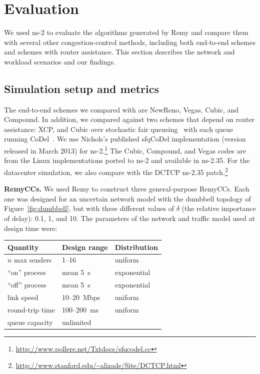 \section{Evaluation}
\label{remy:eval}

We used ns-2 to evaluate the algorithms generated by Remy and compare
them with several other congestion-control methods, including both
end-to-end schemes and schemes with router assistance. This section
describes the network and workload scenarios and our findings.

\subsection{Simulation setup and metrics}

 The end-to-end schemes
we compared with are NewReno, Vegas, Cubic, and Compound. In addition,
we compared against two schemes that depend on router assistance: XCP,
and Cubic over stochastic fair queueing~\cite{sfq} with each queue
running CoDel~\cite{CoDel}. We use Nichols's published sfqCoDel
implementation (version released in March 2013) for
ns-2.\footnote{\url{http://www.pollere.net/Txtdocs/sfqcodel.cc}} The
Cubic, Compound, and Vegas codes are from the Linux implementations
ported to ns-2 and available in ns-2.35.  For the datacenter
simulation, we also compare with the DCTCP ns-2.35
patch.\footnote{\url{http://www.stanford.edu/~alizade/Site/DCTCP.html}}

{\bf RemyCCs.} We used Remy to construct three general-purpose
RemyCCs. Each one was designed for an uncertain network model with the
dumbbell topology of Figure~\ref{fig:dumbbell}, but with three
different values of $\delta$ (the relative importance of delay): 0.1,
1, and 10. The parameters of the network and traffic model used at
design time were:

\vspace{\baselineskip}

\begin{tabular}{lll}
\bf Quantity & \bf Design range & \bf Distribution \\
\hline $n$ max senders & 1--16 & uniform \\
``on'' process & mean 5~s & exponential \\
``off'' process & mean 5~s & exponential \\
link speed & 10--20~Mbps & uniform \\
round-trip time & 100--200~ms & uniform \\
queue capacity & unlimited & \\
\end{tabular}

